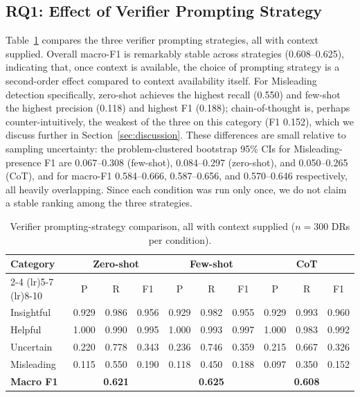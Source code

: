 \documentclass[runningheads]{llncs}
\begin{document}
\subsection{RQ1: Effect of Verifier Prompting Strategy}
Table~\ref{tab:prompt-ablation} compares the three verifier prompting strategies, all with context supplied. Overall macro-F1 is remarkably stable across strategies (0.608--0.625), indicating that, once context is available, the choice of prompting strategy is a second-order effect compared to context availability itself. For Misleading detection specifically, zero-shot achieves the highest recall (0.550) and few-shot the highest precision (0.118) and highest F1 (0.188); chain-of-thought is, perhaps counter-intuitively, the weakest of the three on this category (F1 0.152), which we discuss further in Section~\ref{sec:discussion}. These differences are small relative to sampling uncertainty: the problem-clustered bootstrap 95\% CIs for Misleading-presence F1 are 0.067--0.308 (few-shot), 0.084--0.297 (zero-shot), and 0.050--0.265 (CoT), and for macro-F1 0.584--0.666, 0.587--0.656, and 0.570--0.646 respectively, all heavily overlapping. Since each condition was run only once, we do not claim a stable ranking among the three strategies.

\begin{table}[t]
\centering
\caption{Verifier prompting-strategy comparison, all with context supplied ($n=300$ DRs per condition).}
\label{tab:prompt-ablation}
\footnotesize
\begin{tabular}{lccccccccc}
\toprule
\multirow{2}{*}{Category} & \multicolumn{3}{c}{Zero-shot} & \multicolumn{3}{c}{Few-shot} & \multicolumn{3}{c}{CoT} \\
\cmidrule(lr){2-4} \cmidrule(lr){5-7} \cmidrule(lr){8-10}
 & P & R & F1 & P & R & F1 & P & R & F1 \\
\midrule
Insightful & 0.929 & 0.986 & 0.956 & 0.929 & 0.982 & 0.955 & 0.929 & 0.993 & 0.960 \\
Helpful    & 1.000 & 0.990 & 0.995 & 1.000 & 0.993 & 0.997 & 1.000 & 0.983 & 0.992 \\
Uncertain  & 0.220 & 0.778 & 0.343 & 0.236 & 0.746 & 0.359 & 0.215 & 0.667 & 0.326 \\
Misleading & 0.115 & 0.550 & 0.190 & 0.118 & 0.450 & 0.188 & 0.097 & 0.350 & 0.152 \\
\midrule
\textbf{Macro F1} & \multicolumn{3}{c}{\textbf{0.621}} & \multicolumn{3}{c}{\textbf{0.625}} & \multicolumn{3}{c}{\textbf{0.608}} \\
\bottomrule
\end{tabular}
\end{table}
\end{document}
